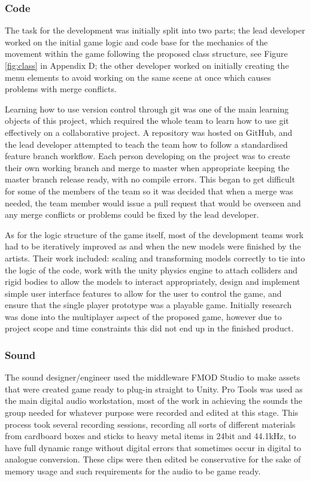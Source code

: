 \documentclass[12pt]{article}
\begin{document}
\subsubsection{Code}

The task for the development was initially split into two parts; the lead developer worked on the initial game logic and code base for the mechanics of the movement within the game following the proposed class structure, see Figure \ref{fig:class} in Appendix D; the other developer worked on initially creating the menu elements to avoid working on the same scene at once which causes problems with merge conflicts. 

Learning how to use version control through git was one of the main learning objects of this project, which required the whole team to learn how to use git effectively on a collaborative project. A repository was hosted on GitHub, and the lead developer attempted to teach the team how to follow a standardised feature branch workflow. Each person developing on the project was to create their own working branch and merge to master when appropriate keeping the master branch release ready, with no compile errors. This began to get difficult for some of the members of the team so it was decided that when a merge was needed, the team member would issue a pull request that would be overseen and any merge conflicts or problems could be fixed by the lead developer.

As for the logic structure of the game itself, most of the development teams work had to be iteratively improved as and when the new models were finished by the artists. Their work included: scaling and transforming models correctly to tie into the logic of the code, work with the unity physics engine to attach colliders and rigid bodies to allow the models to interact appropriately, design and implement simple user interface features to allow for the user to control the game, and ensure that the single player prototype was a playable game. Initially research was done into the multiplayer aspect of the proposed game, however due to project scope and time constraints this did not end up in the finished product.  

\subsubsection{Sound}

The sound designer/engineer used the middleware FMOD Studio to make assets that were created game ready to plug-in straight to Unity. Pro Tools was used as the main digital audio workstation, most of the work in achieving the sounds the group needed for whatever purpose were recorded and edited at this stage. This process took several recording sessions, recording all sorts of different materials from cardboard boxes and sticks to heavy metal items in 24bit and 44.1kHz, to have full dynamic range without digital errors that sometimes occur in digital to analogue conversion. These clips were then edited be conservative for the sake of memory usage and such requirements for the audio to be game ready.
\end{document}
